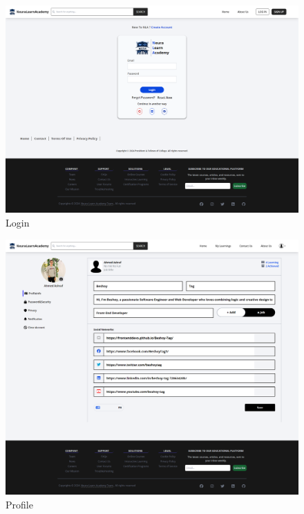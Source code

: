 \begin{figure}[h!]
	\centering
	\includegraphics[max height=\textheight,max width=\textwidth]{figures/frontend/login.png}
	\caption{Login}
\end{figure}

\begin{figure}[h!]
	\centering
	\includegraphics[max height=\textheight,max width=\textwidth]{figures/frontend/profile.png}
	\caption{Profile}
\end{figure}

